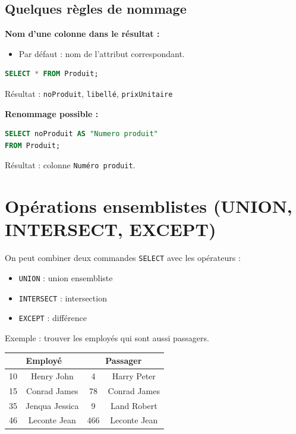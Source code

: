 \subsection{Quelques règles de nommage}

\textbf{Nom d’une colonne dans le résultat :}

\begin{itemize}
    \item Par défaut : nom de l’attribut correspondant.
\end{itemize}

\begin{sqlcodebox}
\begin{lstlisting}[language=SQL]
SELECT * FROM Produit;
\end{lstlisting}
\end{sqlcodebox}

Résultat : \texttt{noProduit}, \texttt{libellé}, \texttt{prixUnitaire}

\medskip

\textbf{Renommage possible :}

\begin{sqlcodebox}
\begin{lstlisting}[language=SQL]
SELECT noProduit AS "Numero produit"
FROM Produit;
\end{lstlisting}
\end{sqlcodebox}

Résultat : colonne \texttt{Numéro produit}.


\section{Opérations ensemblistes (UNION, INTERSECT, EXCEPT)}

On peut combiner deux commandes \texttt{SELECT} avec les opérateurs :
\begin{itemize}
    \item \texttt{UNION} : union ensembliste
    \item \texttt{INTERSECT} : intersection
    \item \texttt{EXCEPT} : différence
\end{itemize}

Exemple : trouver les employés qui sont aussi passagers.

\begin{center}
\begin{tabular}{c c c c}
\multicolumn{2}{c}{\textbf{Employé}} & 
\multicolumn{2}{c}{\textbf{Passager}} \\
\hline
10 & Henry John & 4 & Harry Peter \\
15 & Conrad James & 78 & Conrad James \\
35 & Jenqua Jessica & 9 & Land Robert \\
46 & Leconte Jean & 466 & Leconte Jean 
\end{tabular}
\end{center}

